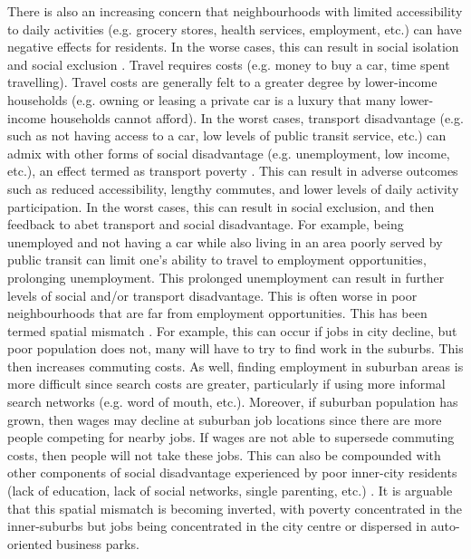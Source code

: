 There is also an increasing concern that neighbourhoods with limited accessibility to daily activities (e.g. grocery stores, health services, employment, etc.) can have negative effects for residents. In the worse cases, this can result in social isolation and social exclusion \cite{ades_are_2012,lucas_transport_2012}. Travel requires costs (e.g. money to buy a car, time spent travelling). Travel costs are generally felt to a greater degree by lower-income households (e.g. owning or leasing a private car is a luxury that many lower-income households cannot afford). In the worst cases, transport disadvantage (e.g. such as not having access to a car, low levels of public transit service, etc.) can admix with other forms of social disadvantage (e.g. unemployment, low income, etc.), an effect termed as transport poverty \cite{lucas_transport_2012}. This can result in adverse outcomes such as reduced accessibility, lengthy commutes, and lower levels of daily activity participation. In the worst cases, this can result in social exclusion, and then feedback to abet transport and social disadvantage. For example, being unemployed and not having a car while also living in an area poorly served by public transit can limit one's ability to travel to employment opportunities, prolonging unemployment. This prolonged unemployment can result in further levels of social and/or transport disadvantage. This is often worse in poor neighbourhoods that are far from employment opportunities. This has been termed spatial mismatch \cite{holzer_spatial_1991}. For example, this can occur if jobs in city decline, but poor population does not, many will have to try to find work in the suburbs. This then increases commuting costs. As well, finding employment in suburban areas is more difficult since search costs are greater, particularly if using more informal search networks (e.g. word of mouth, etc.). Moreover, if suburban population has grown, then wages may decline at suburban job locations since there are more people competing for nearby jobs. If wages are not able to supersede commuting costs, then people will not take these jobs. This can also be compounded with other components of social disadvantage experienced by poor inner-city residents (lack of education, lack of social networks, single parenting, etc.) \cite{holzer_spatial_1991}. It is arguable that this spatial mismatch is becoming inverted, with poverty concentrated in the inner-suburbs but jobs being concentrated in the city centre or dispersed in auto-oriented business parks. 

